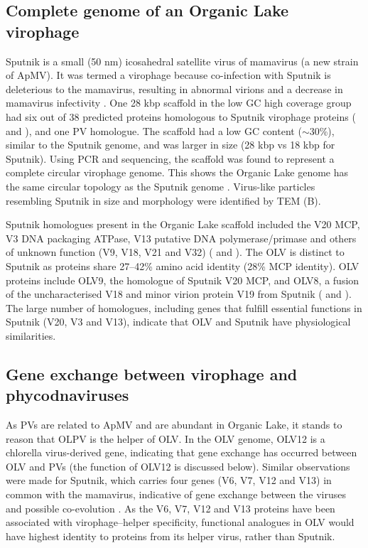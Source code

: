 \subsection{Complete genome of an Organic Lake virophage}
Sputnik is a small (50 nm) icosahedral satellite virus of mamavirus (a new strain of \ac{ApMV}). 
It was termed a virophage because co-infection with Sputnik is deleterious to the mamavirus, resulting in abnormal virions and a decrease in mamavirus infectivity \cite{LaScola2008}. 
One 28 kbp scaffold in the low GC high coverage group had six out of 38 predicted proteins homologous to Sputnik virophage proteins ( and ), and one \ac{PV} homologue. 
The scaffold had a low GC content ($\sim$30\%), similar to the Sputnik genome, and was larger in size (28 kbp vs 18 kbp for Sputnik). 
Using \ac{PCR} and sequencing, the scaffold was found to represent a complete circular virophage genome.
This shows the Organic Lake genome has the same circular topology as the Sputnik genome \cite{LaScola2008}. 
Virus-like particles resembling Sputnik in size and morphology were identified by \ac{TEM} (B).



Sputnik homologues present in the Organic Lake scaffold included the V20 \ac{MCP}, V3 \textsc{DNA} packaging \textsc{ATP}ase, V13 putative \textsc{DNA} polymerase/primase and others of unknown function (V9, V18, V21 and V32) ( and ). 
The \ac{OLV} is distinct to Sputnik as proteins share 27--42\% amino acid identity (28\% \ac{MCP} identity). 
\ac{OLV} proteins include OLV9, the homologue of Sputnik V20 \ac{MCP}, and OLV8, a fusion of the uncharacterised V18 and minor virion protein V19 from Sputnik ( and ). 
The large number of homologues, including genes that fulfill essential functions in Sputnik (V20, V3 and V13), indicate that \ac{OLV} and Sputnik have physiological similarities. 

\subsection{Gene exchange between virophage and phycodnaviruses}

As \acp{PV} are related to \ac{ApMV} \cite{Iyer2006} and are abundant in Organic Lake, it stands to reason that \ac{OLPV} is the helper of \ac{OLV}. 
In the \ac{OLV} genome, OLV12 is a chlorella virus-derived gene, indicating that gene exchange has occurred between \ac{OLV} and \acp{PV} (the function of OLV12 is discussed below).
Similar observations were made for Sputnik, which carries four genes (V6, V7, V12 and V13) in common with the mamavirus, indicative of gene exchange between the viruses and possible co-evolution \cite{LaScola2008}. 
As the V6, V7, V12 and V13 proteins have been associated with virophage--helper specificity, functional analogues in \ac{OLV} would have highest identity to proteins from its helper virus, rather than Sputnik. 

